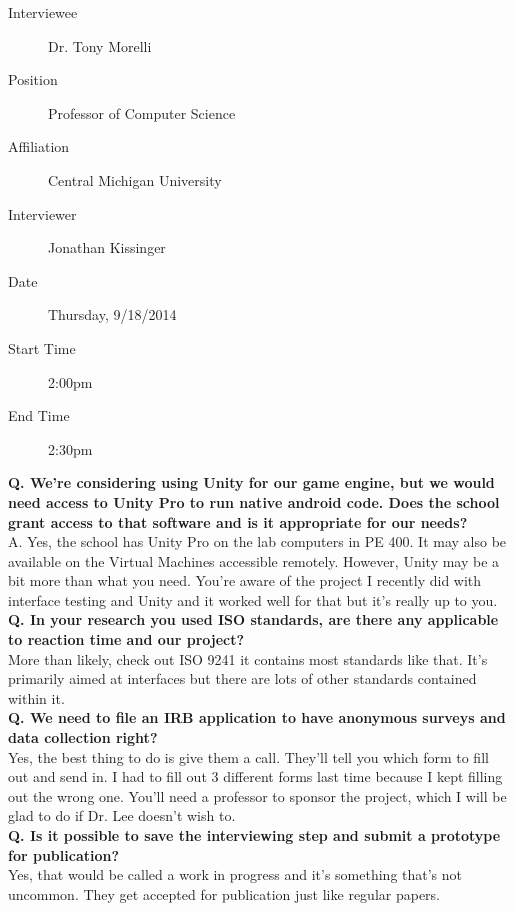 \documentclass[a4wide]{article}
\begin{document}
\begin{description}
\item[Interviewee] Dr. Tony Morelli
\item[Position] Professor of Computer Science
\item[Affiliation] Central Michigan University
\item[Interviewer] Jonathan Kissinger
\item[Date] Thursday, 9/18/2014
\item[Start Time] 2:00pm
\item[End Time] 2:30pm
\end{description}
\textbf{Q. We're considering using Unity for our game engine, but we would need
access to Unity Pro to run native android code.  Does the school grant access to
that software and is it appropriate for our needs?}\\
A. Yes, the school has Unity Pro on the lab computers in PE 400.  It may also be
available on the Virtual Machines accessible remotely.  However, Unity may be a
bit more than what you need.  You're aware of the project I recently did with
interface testing and Unity and it worked well for that but it's really up to
you.\vspace{2.0 mm}\\
\textbf{Q. In your research you used ISO standards, are there any applicable to
reaction time and our project?}\\
More than likely, check out ISO 9241 it contains most standards like that.  It's
primarily aimed at interfaces but there are lots of other standards contained
within it.\vspace{2.0 mm}\\
\textbf{Q. We need to file an IRB application to have anonymous surveys and data
collection right?}\\
Yes, the best thing to do is give them a call.  They'll tell you which form to
fill out and send in.  I had to fill out 3 different forms last time because I
kept filling out the wrong one.  You'll need a professor to sponsor the project,
which I will be glad to do if Dr. Lee doesn't wish to.\vspace{2.0 mm}\\
\textbf{Q. Is it possible to save the interviewing step and submit a prototype
for publication?}\\
Yes, that would be called a work in progress and it's something that's not
uncommon.  They get accepted for publication just like regular papers.
\end{document}
